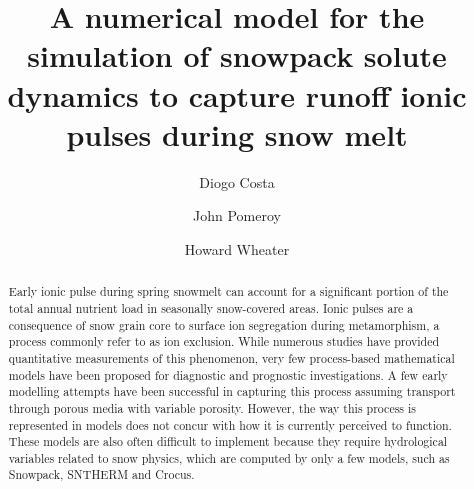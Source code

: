 \documentclass[authoryear,preprint,review,12pt]{elsarticle}
\begin{document}
\begin{frontmatter}



\title{A numerical model for the simulation of snowpack solute dynamics to capture runoff ionic pulses during snow melt}

 \author[label1,label2]{Diogo Costa}
 \author[label1,label2]{John Pomeroy}
 \author[label2]{Howard Wheater}

 
 \address[label1]{Centre for Hydrology, University of Saskatchewan diogo.costa\makeatletter@arch.usask.ca}
 \address[label2]{Global Institute for Water Security}
 \address[label3]{Environment and Climate Change Canada, National Hydrology Research Centre}

\begin{abstract}

Early ionic pulse during spring snowmelt can account for a significant portion of the total annual nutrient load in seasonally snow-covered areas. Ionic pulses are a consequence of snow grain core to surface ion segregation during metamorphism, a process commonly refer to as ion exclusion. While numerous studies have provided quantitative measurements of this phenomenon, very few process-based mathematical models have been proposed for diagnostic and prognostic investigations. A few early modelling attempts have been successful in capturing this process assuming transport through porous media with variable porosity. However, the way this process is represented in models does not concur with how it is currently perceived to function. These models are also often difficult to implement because they require hydrological variables related to snow physics, which are computed by only a few models, such as Snowpack, SNTHERM and Crocus. \par


\end{abstract}
\end{frontmatter}
\end{document}
